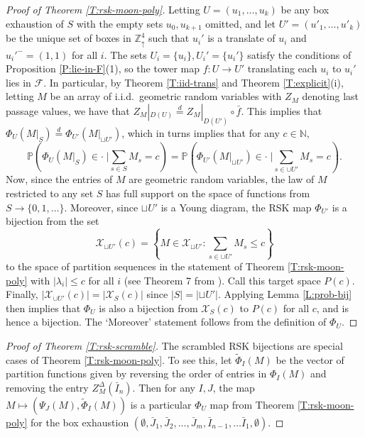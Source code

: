 \documentclass[aop, preprint]{imsart}
\theoremstyle{plain}
\theoremstyle{definition}
\theoremstyle{plain}
\newcommand{\N}{\mathbb{N}}
\newcommand{\p}{\mathbb{P}}
\newcommand{\la}{\lambda}
\newcommand{\Zd}{\mathds{Z}^4_\uparrow}
\newcommand{\scrF}{\mathcal{F}}
\newcommand{\scrX}{\mathcal{X}}
\newcommand{\eqd}{\stackrel{d}{=}}
\newcommand{\lf}{\left}
\newcommand{\rg}{\right}
\begin{document}
\begin{proof}[Proof of Theorem \ref{T:rsk-moon-poly}]
	Letting $U = (u_1, \dots, u_k)$ be any box exhaustion of $S$ with the empty sets $u_0, u_{k+1}$ omitted, and let $U' = (u'_1, \dots, u'_k)$ be the unique set of boxes in $\Zd$ such that $u_i'$ is a translate of $u_i$ and $u_i'^- = (1, 1)$ for all $i$. The sets $U_i = \{u_i\}, U_i' = \{u_i'\}$ satisfy the conditions of Proposition \ref{P:lie-in-F}(1), so the tower map $f:U \to U'$ translating each $u_i$ to $u_i'$ lies in $\scrF$. In particular, by Theorem \ref{T:iid-trans} and Theorem \ref{T:explicit}(i), letting $M$ be an array of i.i.d.\ geometric random variables with $Z_M$ denoting last passage values, we have that
	$
	Z_M|_{D(U)} \eqd Z_M|_{D(U')} \circ \bar f.
	$
	This implies that $\Phi_U(M|_{S}) \eqd \Phi_{U'}(M|_{\sqcup U'})$, which in turns implies that for any $c \in \N$,
	\begin{equation}
	\p \lf( \Phi_U(M|_{S}) \in \cdot \; \bigg| \sum_{s \in S} M_s = c \rg) = \p \lf( \Phi_{U'}(M|_{\sqcup U'}) \in \cdot \; \bigg| \sum_{s \in \cup U'} M_s = c \rg).
	\end{equation}
	Now, since the entries of $M$ are geometric random variables, the law of $M$ restricted to any set $S$ has full support on the space of functions from $S \to \{0, 1, \dots \}.$ Moreover, since $\sqcup U'$ is a Young diagram, the RSK map $\Phi_{U'}$ is a bijection from the set 
	$$
	\scrX_{\sqcup U'} (c) = \lf\{M \in \scrX_{\sqcup U'} : \sum_{s \in \cup U'} M_s \le c\rg\}
	$$
	to the space of partition sequences in the statement of Theorem \ref{T:rsk-moon-poly} with $|\la_i| \le c$ for all $i$ (see Theorem 7 from \citep{krattenthaler2005growth}). Call this target space $P(c)$. Finally, $|\scrX_{\cup U'}(c)| = |\scrX_S(c)|$ since $|S| = |\sqcup U'|$. Applying Lemma \ref{L:prob-bij} then implies that $\Phi_U$ is also a bijection from $\scrX_{S}(c)$ to $P(c)$ for all $c$, and is hence a bijection. The `Moreover' statement follows from the definition of $\Phi_U$.
\end{proof}

\begin{proof}[Proof of Theorem \ref{T:rsk-scramble}]
	The scrambled RSK bijections are special cases of Theorem \ref{T:rsk-moon-poly}. To see this, let $\tilde \Phi_I(M)$ be the vector of partition functions given by reversing the order of entries in $\Phi_I(M)$ and removing the entry $Z_M^\Delta(\bar I_n)$. Then for any $I, J$, the map $M \mapsto (\Psi_J(M), \tilde \Phi_I(M))$ is a particular $\Phi_U$ map from Theorem \ref{T:rsk-moon-poly} for the box exhaustion $(\emptyset, \bar J_1, \bar J_2, \dots, \bar J_m, \bar I_{n-1}, \dots \bar I_1, \emptyset)$.
\end{proof}
\end{document}
